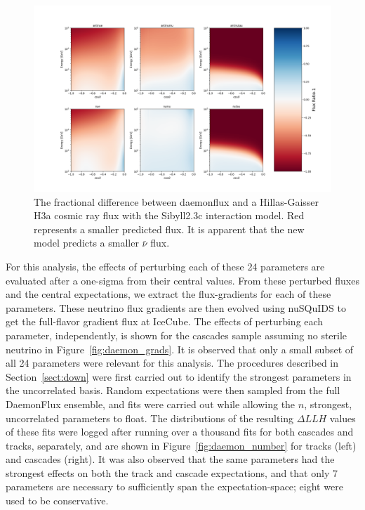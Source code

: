 \documentclass[main.tex]{subfiles}
\begin{document}
\begin{figure}
    \centering
    \includegraphics[width=0.8\linewidth]{figures/flux_plot_manyratio.png}
    \caption{The fractional difference between daemonflux and a Hillas-Gaisser H3a cosmic ray flux with the Sibyll2.3c interaction model. Red represents a smaller predicted flux. It is apparent that the new model predicts a smaller $\bar{\nu}$ flux.}\label{fig:fractional_diff}
\end{figure}

For this analysis, the effects of perturbing each of these 24 parameters are evaluated after a one-sigma from their central values.
From these perturbed fluxes and the central expectations, we extract the flux-gradients for each of these parameters.
These neutrino flux gradients are then evolved using nuSQuIDS to get the full-flavor gradient flux at IceCube. 
The effects of perturbing each parameter, independently, is shown for the cascades sample assuming no sterile neutrino in Figure~\ref{fig:daemon_grads}.
It is observed that only a small subset of all 24 parameters were relevant for this analysis. 
The procedures described in Section~\ref{sect:down} were first carried out to identify the strongest parameters in the uncorrelated basis. 
Random expectations were then sampled from the full DaemonFlux ensemble, and fits were carried out while allowing the $n$, strongest, uncorrelated parameters to float. 
The distributions of the resulting $\Delta LLH$ values of these fits were logged after running over a thousand fits for both cascades and tracks, separately, and are shown in Figure~\ref{fig:daemon_number} for tracks (left) and cascades (right). 
It was also observed that the same parameters had the strongest effects on both the track and cascade expectations, and that only 7 parameters are necessary to sufficiently span the expectation-space; eight were used to be conservative. 

\end{document}
